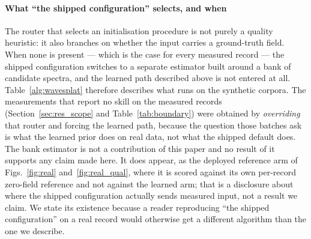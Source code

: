 \documentclass[review]{elsarticle}
\begin{document}
\paragraph{What ``the shipped configuration'' selects, and when}
The router that selects an initialisation procedure is not purely a quality
heuristic: it also branches on whether the input carries a ground-truth field.
When none is present --- which is the case for every measured record --- the
shipped configuration switches to a separate estimator built around a bank of
candidate spectra, and the learned path described above is not entered at all.
Table~\ref{alg:wavesplat} therefore describes what runs on the synthetic corpora.
The measurements that report no skill on the measured records
(Section~\ref{sec:res_scope} and Table~\ref{tab:boundary}) were obtained by
\emph{overriding} that router and forcing the learned path, because the question those batches ask is what the learned prior does
on real data, not what the shipped default does. %
The bank estimator is not a contribution of this
paper and no result of it supports any claim made here. It does appear, as the
deployed reference arm of Figs.~\ref{fig:real} and~\ref{fig:real_qual}, where it is
scored against its own per-record zero-field reference and not against the learned
arm; that is a disclosure about where the shipped configuration actually sends
measured input, not a result we claim. We state its existence because a reader
reproducing ``the shipped configuration'' on a real record would otherwise get a
different algorithm than the one we describe.
\end{document}

